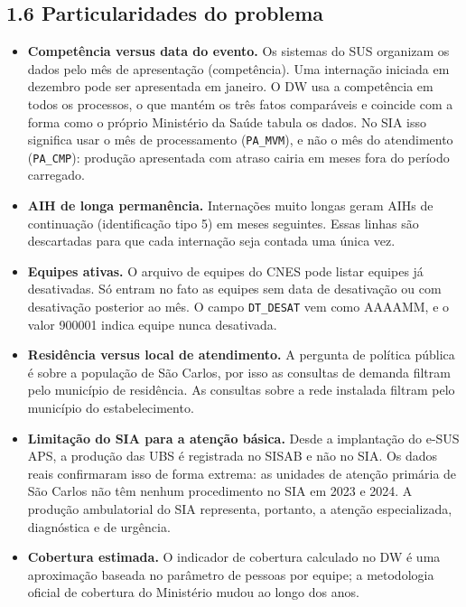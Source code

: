 \documentclass[12pt,a4paper]{article}
\begin{document}
\FloatBarrier\subsection*{1.6 Particularidades do problema}

\begin{itemize}\item \textbf{Competência versus data do evento.} Os sistemas do SUS organizam os dados pelo mês de apresentação (competência). Uma internação iniciada em dezembro pode ser apresentada em janeiro. O DW usa a competência em todos os processos, o que mantém os três fatos comparáveis e coincide com a forma como o próprio Ministério da Saúde tabula os dados. No SIA isso significa usar o mês de processamento (\texttt{PA\_\allowbreak{}MVM}), e não o mês do atendimento (\texttt{PA\_\allowbreak{}CMP}): produção apresentada com atraso cairia em meses fora do período carregado.
\item \textbf{AIH de longa permanência.} Internações muito longas geram AIHs de continuação (identificação tipo 5) em meses seguintes. Essas linhas são descartadas para que cada internação seja contada uma única vez.
\item \textbf{Equipes ativas.} O arquivo de equipes do CNES pode listar equipes já desativadas. Só entram no fato as equipes sem data de desativação ou com desativação posterior ao mês. O campo \texttt{DT\_\allowbreak{}DESAT} vem como AAAAMM, e o valor 900001 indica equipe nunca desativada.
\item \textbf{Residência versus local de atendimento.} A pergunta de política pública é sobre a população de São Carlos, por isso as consultas de demanda filtram pelo município de residência. As consultas sobre a rede instalada filtram pelo município do estabelecimento.
\item \textbf{Limitação do SIA para a atenção básica.} Desde a implantação do e-SUS APS, a produção das UBS é registrada no SISAB e não no SIA. Os dados reais confirmaram isso de forma extrema: as unidades de atenção primária de São Carlos não têm nenhum procedimento no SIA em 2023 e 2024. A produção ambulatorial do SIA representa, portanto, a atenção especializada, diagnóstica e de urgência.
\item \textbf{Cobertura estimada.} O indicador de cobertura calculado no DW é uma aproximação baseada no parâmetro de pessoas por equipe; a metodologia oficial de cobertura do Ministério mudou ao longo dos anos.\end{itemize}
\end{document}
